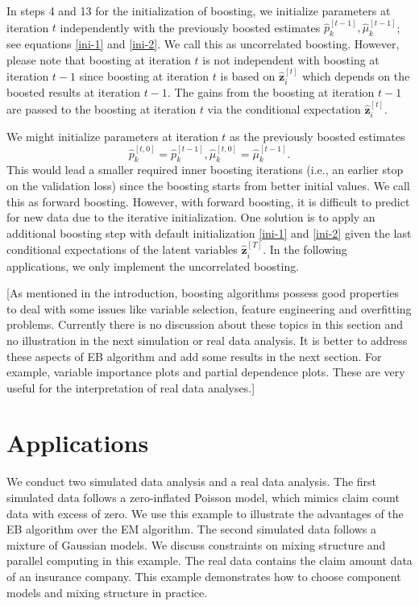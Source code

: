 \documentclass[11pt]{article}
\numberwithin{equation}{section}
\def\bz{\boldsymbol{z}}
\begin{document}
In steps 4 and 13 for the initialization of boosting, 
we initialize parameters at iteration $t$ {independently} with the previously boosted estimates $\hat{p}_k^{[t-1]}, \hat{\mu}_k^{[t-1]}$; 
	see equations \eqref{ini-1} and \eqref{ini-2}. 
	We call this as uncorrelated boosting.
	However, please note that boosting at iteration $t$ is not independent with boosting at iteration $t-1$ 
since boosting at iteration $t$ is based on $\hat{\bz}_i^{[t]}$ which depends on the boosted results at iteration $t-1$. 
The gains from the boosting at iteration $t-1$ are passed to  the boosting at iteration $t$ via the conditional expectation $\hat{\bz}_i^{[t]}$. 
	
	We might initialize parameters at iteration $t$ as the previously boosted estimates $$\hat{p}_k^{[t,0]}=\hat{p}_k^{[t-1]}, \hat{\mu}_k^{[t,0]}=\hat{\mu}_k^{[t-1]}.$$
This would lead a {smaller} required inner boosting iterations (i.e., an {earlier} stop on the validation loss) since the boosting starts from better initial values.
	We call this as forward boosting. 
	However, with forward boosting, it is difficult to predict for new data due to the {iterative initialization}. 
	One solution is to apply an additional boosting step with default initialization \eqref{ini-1} and \eqref{ini-2} given the {last conditional expectations of the latent variables $\hat{\bz}^{[T]}_i$}. 
	In the following applications, we only implement the uncorrelated boosting.

{\color{blue}[As mentioned in the introduction, boosting algorithms possess good properties to deal with some issues like variable selection, feature engineering and overfitting problems. Currently there is no discussion about these topics in this section and no illustration in the next simulation or real data analysis. It is better to address these aspects of EB algorithm and add some results in the next section. For example, variable importance plots and partial dependence plots. These are very useful for the interpretation of real data analyses.]}

	
\section{Applications}\label{sec:application}

We conduct two simulated data analysis and a real data analysis. 
The first simulated data follows a zero-inflated Poisson model, which mimics claim count data with excess of zero.
We use this example to illustrate the advantages of the EB algorithm over the EM algorithm.
The second simulated data follows a mixture of Gaussian models. 
We discuss constraints on mixing structure and parallel computing in this example.
The real data contains the claim amount data of an insurance company. 
This example demonstrates how to choose component models and mixing structure in practice.
\end{document}
